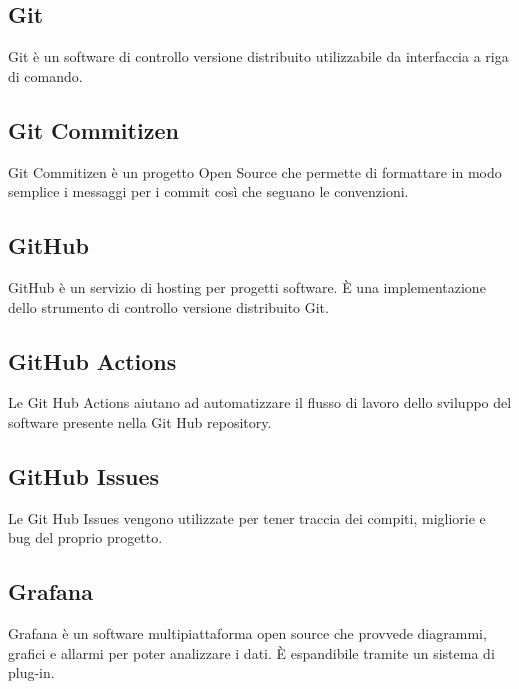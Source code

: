 
\subsection*{Git}
Git è un software di controllo versione distribuito utilizzabile da interfaccia a riga di comando.

\subsection*{Git Commitizen}
Git Commitizen è un progetto Open Source che permette di formattare in modo semplice i messaggi per i commit così che seguano le convenzioni.

\subsection*{GitHub}
GitHub è un servizio di hosting per progetti software. È una implementazione dello strumento di controllo versione distribuito Git.

\subsection*{GitHub Actions}
Le Git Hub Actions aiutano ad automatizzare il flusso di lavoro dello sviluppo del software presente nella Git Hub repository.

\subsection*{GitHub Issues}
Le Git Hub Issues vengono utilizzate per tener traccia dei compiti, migliorie e bug del proprio progetto.

\subsection*{Grafana}
Grafana è un software multipiattaforma open source che provvede diagrammi, grafici e allarmi per poter analizzare i dati. È espandibile tramite un sistema di plug-in.

